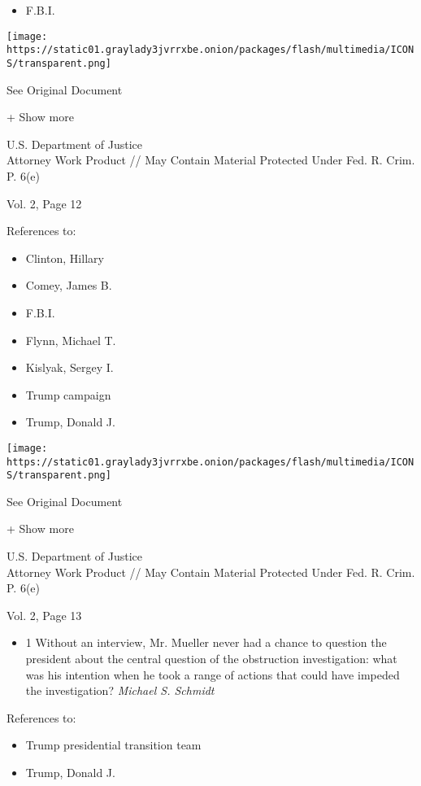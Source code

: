 \begin{itemize}
\tightlist
\item
  F.B.I.
\end{itemize}

\protect\hyperlink{}{}

\texttt{[image: https://static01.graylady3jvrrxbe.onion/packages/flash/multimedia/ICONS/transparent.png]}

See Original Document

+ Show more

U.S. Department of Justice\\
Attorney Work Product // May Contain Material Protected Under Fed. R.
Crim. P. 6(e)

Vol. 2, Page 12

References to:

\begin{itemize}
\tightlist
\item
  Clinton, Hillary
\item
  Comey, James B.
\item
  F.B.I.
\item
  Flynn, Michael T.
\item
  Kislyak, Sergey I.
\item
  Trump campaign
\item
  Trump, Donald J.
\end{itemize}

\protect\hyperlink{}{}

\texttt{[image: https://static01.graylady3jvrrxbe.onion/packages/flash/multimedia/ICONS/transparent.png]}

See Original Document

+ Show more

U.S. Department of Justice\\
Attorney Work Product // May Contain Material Protected Under Fed. R.
Crim. P. 6(e)

Vol. 2, Page 13

\begin{itemize}
\tightlist
\item
  1 Without an interview, Mr. Mueller never had a chance to question the
  president about the central question of the obstruction investigation:
  what was his intention when he took a range of actions that could have
  impeded the investigation? \emph{Michael S. Schmidt}
\end{itemize}

References to:

\begin{itemize}
\tightlist
\item
  Trump presidential transition team
\item
  Trump, Donald J.
\end{itemize}

